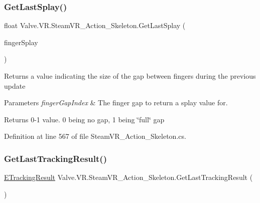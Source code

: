 \subsubsection{\texorpdfstring{GetLastSplay()}{GetLastSplay()}\hspace{0.1cm}{\footnotesize\ttfamily [2/2]}}
{\footnotesize\ttfamily float Valve.\+V\+R.\+Steam\+V\+R\+\_\+\+Action\+\_\+\+Skeleton.\+Get\+Last\+Splay (\begin{DoxyParamCaption}\item[{\mbox{\hyperlink{namespace_valve_1_1_v_r_a43c97e13fe46f0575986b9f74945e0bf}{Steam\+V\+R\+\_\+\+Skeleton\+\_\+\+Finger\+Splay\+Index\+Enum}}}]{finger\+Splay }\end{DoxyParamCaption})}



Returns a value indicating the size of the gap between fingers during the previous update 


\begin{DoxyParams}{Parameters}
{\em finger\+Gap\+Index} & The finger gap to return a splay value for. \\
\hline
\end{DoxyParams}
\begin{DoxyReturn}{Returns}
0-\/1 value. 0 being no gap, 1 being \char`\"{}full\char`\"{} gap
\end{DoxyReturn}


Definition at line 567 of file Steam\+V\+R\+\_\+\+Action\+\_\+\+Skeleton.\+cs.

\mbox{\label{class_valve_1_1_v_r_1_1_steam_v_r___action___skeleton_ad84ef6df0708c1397e3168658508d57c}} 
\subsubsection{\texorpdfstring{GetLastTrackingResult()}{GetLastTrackingResult()}}
{\footnotesize\ttfamily \mbox{\hyperlink{namespace_valve_1_1_v_r_abe6feab98f33191b7c27b4292012e90a}{E\+Tracking\+Result}} Valve.\+V\+R.\+Steam\+V\+R\+\_\+\+Action\+\_\+\+Skeleton.\+Get\+Last\+Tracking\+Result (\begin{DoxyParamCaption}{ }\end{DoxyParamCaption})}



